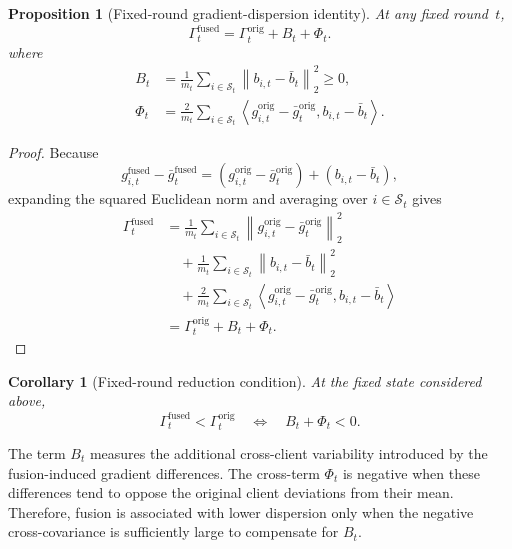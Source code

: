 \documentclass[twoside]{article}
\theoremstyle{thmstyleone}%
\newtheorem{proposition}[theorem]{Proposition}%
\newtheorem{corollary}{Corollary}
\theoremstyle{thmstyletwo}%
\theoremstyle{thmstylethree}%
\begin{document}
\begin{proposition}[Fixed-round gradient-dispersion identity]
\label{prop:fixed_round_decomposition}
At any fixed round~$t$,
\begin{equation}
\label{eq:exact_decomp}
\Gamma_t^{\mathrm{fused}}
=
\Gamma_t^{\mathrm{orig}}
+
B_t
+
\Phi_t.
\end{equation}
where
\begin{align*}
B_t
&=
\frac{1}{m_t}
\sum_{i\in\mathcal{S}_t}
\left\|
b_{i,t}-\bar{b}_t
\right\|_2^2
\geq 0,\\
\Phi_t
&=
\frac{2}{m_t}
\sum_{i\in\mathcal{S}_t}
\left\langle
g_{i,t}^{\mathrm{orig}}-\bar{g}_t^{\mathrm{orig}},
b_{i,t}-\bar{b}_t
\right\rangle .
\end{align*}
\end{proposition}

\begin{proof}
Because
\begin{equation*}
g_{i,t}^{\mathrm{fused}}
-
\bar{g}_t^{\mathrm{fused}}
=
\left(
g_{i,t}^{\mathrm{orig}}
-
\bar{g}_t^{\mathrm{orig}}
\right)
+
\left(
b_{i,t}-\bar{b}_t
\right),
\end{equation*}
expanding the squared Euclidean norm and averaging over
$i\in\mathcal{S}_t$ gives
\begin{align*}
\Gamma_t^{\mathrm{fused}}
&=
\frac{1}{m_t}
\sum_{i\in\mathcal{S}_t}
\left\|
g_{i,t}^{\mathrm{orig}}
-
\bar{g}_t^{\mathrm{orig}}
\right\|_2^2\\
&\quad+
\frac{1}{m_t}
\sum_{i\in\mathcal{S}_t}
\left\|
b_{i,t}-\bar{b}_t
\right\|_2^2\\
&\quad+
\frac{2}{m_t}
\sum_{i\in\mathcal{S}_t}
\left\langle
g_{i,t}^{\mathrm{orig}}-\bar{g}_t^{\mathrm{orig}},
b_{i,t}-\bar{b}_t
\right\rangle\\
&=
\Gamma_t^{\mathrm{orig}}+B_t+\Phi_t.
\end{align*}
\end{proof}

\begin{corollary}[Fixed-round reduction condition]
\label{cor:fixed_round_reduction}
At the fixed state considered above,
\begin{equation*}
\Gamma_t^{\mathrm{fused}}
<
\Gamma_t^{\mathrm{orig}}
\quad\Longleftrightarrow\quad
B_t+\Phi_t<0.
\end{equation*}
\end{corollary}

The term $B_t$ measures the additional cross-client variability introduced by
the fusion-induced gradient differences. The cross-term $\Phi_t$ is negative
when these differences tend to oppose the original client deviations from
their mean. Therefore, fusion is associated with lower dispersion only when
the negative cross-covariance is sufficiently large to compensate for
$B_t$.
\end{document}
